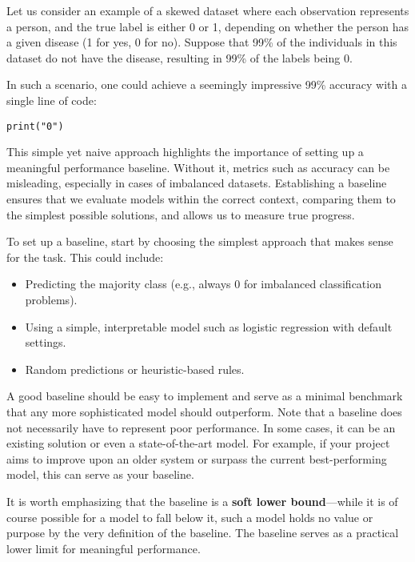 \documentclass[12pt,openany, draft]{book}
\begin{document}
Let us consider an example of a skewed dataset where each observation represents a person, and the true label is either 0 or 1, depending on whether the person has a given disease (1 for yes, 0 for no). Suppose that 99\% of the individuals in this dataset do not have the disease, resulting in 99\% of the labels being 0.

In such a scenario, one could achieve a seemingly impressive 99\% accuracy with a single line of code:

\begin{verbatim}
print("0")
\end{verbatim}

This simple yet naive approach highlights the importance of setting up a meaningful performance baseline. Without it, metrics such as accuracy can be misleading, especially in cases of imbalanced datasets. Establishing a baseline ensures that we evaluate models within the correct context, comparing them to the simplest possible solutions, and allows us to measure true progress. \newline

To set up a baseline, start by choosing the simplest approach that makes sense for the task. This could include:
\begin{itemize}
    \item Predicting the majority class (e.g., always 0 for imbalanced classification problems).
    \item Using a simple, interpretable model such as logistic regression with default settings.
    \item Random predictions or heuristic-based rules.
\end{itemize}

A good baseline should be easy to implement and serve as a minimal benchmark that 
any more sophisticated model should outperform. Note that a baseline does not 
necessarily have to represent poor performance. In some cases, it can be an existing 
solution or even a state-of-the-art model. For example, if your project aims to 
improve upon an older system or surpass the current best-performing model, this 
can serve as your baseline. \newline

It is worth emphasizing that the baseline is a \textbf{soft lower bound}---while it 
is of course possible for a model to fall below it, such a model holds no value or purpose by the very definition of the baseline. The baseline serves as a practical lower limit for meaningful performance.  \newline
\end{document}
